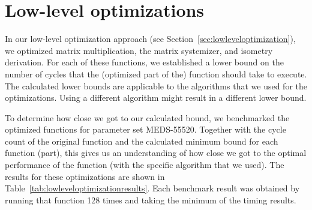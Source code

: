 \documentclass[11pt,a4paper]{report}
\theoremstyle{definition}
\begin{document}
\section{Low-level optimizations}
\label{sec:resultslowlevel}
In our low-level optimization approach (see Section~\ref{sec:lowleveloptimization}), we optimized matrix multiplication, the matrix systemizer, and isometry derivation. For each of these functions, we established a lower bound on the number of cycles that the (optimized part of the) function should take to execute. The calculated lower bounds are applicable to the algorithms that we used for the optimizations. Using a different algorithm might result in a different lower bound.

To determine how close we got to our calculated bound, we benchmarked the optimized functions for parameter set MEDS-55520. Together with the cycle count of the original function and the calculated minimum bound for each function (part), this gives us an understanding of how close we got to the optimal performance of the function (with the specific algorithm that we used). The results for these optimizations are shown in Table~\ref{tab:lowleveloptimizationresults}. Each benchmark result was obtained by running that function 128 times and taking the minimum of the timing results.
\end{document}
